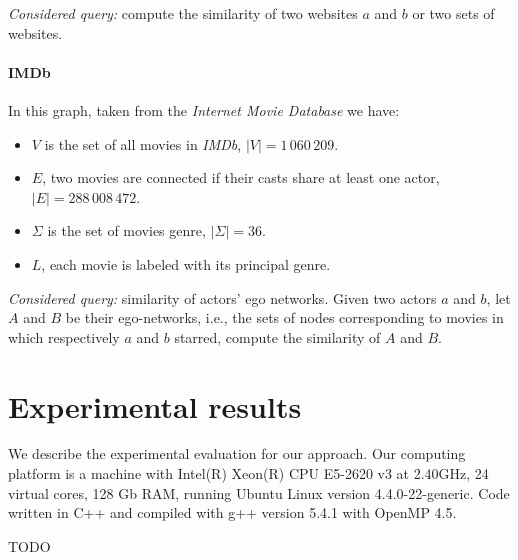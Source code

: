     \textsl{Considered query:} compute the similarity of two websites $a$ and $b$ or two sets of websites.
    
    \paragraph*{IMDb} In this graph, taken from the \textit{Internet Movie Database} we have:
    
    \begin{itemize}
    	\item $V$ is the set of all movies in \textit{IMDb},  $|V| = 1\,060\,209$.
		\item $E$, two movies are connected if their casts share at least one actor, $|E| = 288\,008\,472$.
		\item $\Sigma$ is the set of movies genre, $|\Sigma| = 36$.
		\item $L$, each movie is labeled with its principal genre.
    \end{itemize}
    
    
    \textsl{Considered query:} similarity of actors' ego networks. Given two actors $a$ and $b$, let $A$ and $B$ be their ego-networks, i.e., the sets of nodes corresponding to movies in which respectively $a$ and $b$ starred, compute the similarity of $A$ and $B$.
    
    \section{Experimental results}

    We describe the experimental evaluation for our approach. Our computing platform is a machine with Intel(R) Xeon(R) CPU E5-2620 v3 at 2.40GHz, 24 virtual cores, 128 Gb RAM, running Ubuntu Linux version 4.4.0-22-generic. Code written in C++ and compiled with g++ version 5.4.1 with OpenMP 4.5. 
    
	TODO 